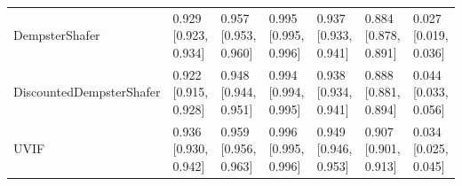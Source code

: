 \begin{table}[t]
{\begin{tabular}{lllllll}
DempsterShafer & 0.929 [0.923, 0.934] & 0.957 [0.953, 0.960] & 0.995 [0.995, 0.996] & 0.937 [0.933, 0.941] & 0.884 [0.878, 0.891] & 0.027 [0.019, 0.036] \\
DiscountedDempsterShafer & 0.922 [0.915, 0.928] & 0.948 [0.944, 0.951] & 0.994 [0.994, 0.995] & 0.938 [0.934, 0.941] & 0.888 [0.881, 0.894] & 0.044 [0.033, 0.056] \\
UVIF & 0.936 [0.930, 0.942] & 0.959 [0.956, 0.963] & 0.996 [0.995, 0.996] & 0.949 [0.946, 0.953] & 0.907 [0.901, 0.913] & 0.034 [0.025, 0.045] \\
\bottomrule
\end{tabular}
}
\end{table}
